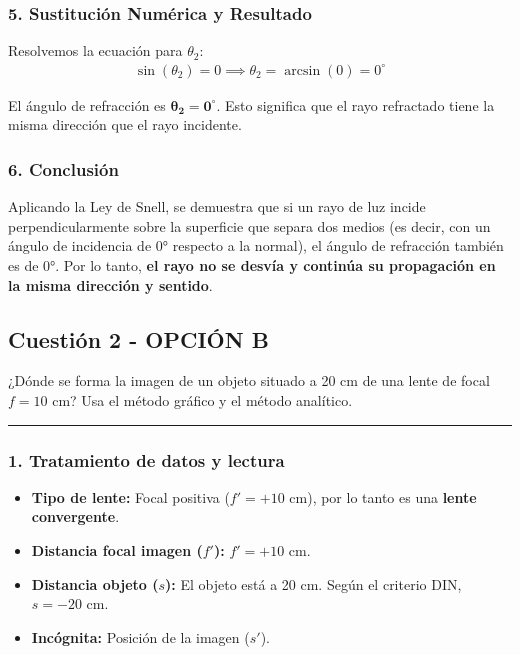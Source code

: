 \subsubsection*{5. Sustitución Numérica y Resultado}
Resolvemos la ecuación para $\theta_2$:
\begin{gather}
    \sin(\theta_2) = 0 \implies \theta_2 = \arcsin(0) = 0^\circ
\end{gather}
\begin{cajaresultado}
    El ángulo de refracción es $\boldsymbol{\theta_2 = 0^\circ}$. Esto significa que el rayo refractado tiene la misma dirección que el rayo incidente.
\end{cajaresultado}

\subsubsection*{6. Conclusión}
\begin{cajaconclusion}
    Aplicando la Ley de Snell, se demuestra que si un rayo de luz incide perpendicularmente sobre la superficie que separa dos medios (es decir, con un ángulo de incidencia de 0° respecto a la normal), el ángulo de refracción también es de 0°. Por lo tanto, \textbf{el rayo no se desvía y continúa su propagación en la misma dirección y sentido}.
\end{cajaconclusion}

\newpage

\subsection{Cuestión 2 - OPCIÓN B}
\label{subsec:3B_2005_sep_cv}

\begin{cajaenunciado}
¿Dónde se forma la imagen de un objeto situado a 20 cm de una lente de focal $f=10$ cm? Usa el método gráfico y el método analítico.
\end{cajaenunciado}
\hrule

\subsubsection*{1. Tratamiento de datos y lectura}
\begin{itemize}
    \item \textbf{Tipo de lente:} Focal positiva ($f'=+10$ cm), por lo tanto es una \textbf{lente convergente}.
    \item \textbf{Distancia focal imagen ($f'$):} $f' = +10$ cm.
    \item \textbf{Distancia objeto ($s$):} El objeto está a 20 cm. Según el criterio DIN, $s = -20$ cm.
    \item \textbf{Incógnita:} Posición de la imagen ($s'$).
\end{itemize}

